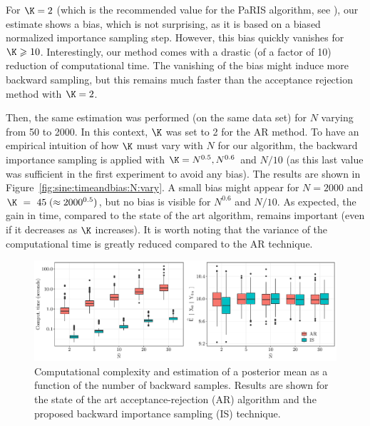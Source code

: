\documentclass[12pt]{article}
\newcommand{\N}{N}
\newcommand{\eqsp}{\;}
\begin{document}
For $\K = 2$ (which is the recommended value for the PaRIS algorithm, see \cite{olsson2017efficient}), our estimate shows a bias, which is not surprising, as it is based on a biased normalized importance sampling step. However, this bias quickly vanishes for $\K \geqslant 10$. 
Interestingly, our method comes with a drastic (of a factor of 10) reduction of computational time. 
The vanishing of the bias might induce more backward sampling, but this remains much faster than the acceptance rejection method with $\K = 2$.

Then, the same estimation was performed (on the same data set) for $\N$ varying from 50 to 2000.
In this context, $\K$ was set to 2 for the AR method. 
To have an empirical intuition of how $\K$ must vary with $\N$ for our algorithm, the backward importance sampling  is applied with $\K = \N^{0.5}, \N^{0.6}$ and $N / 10$ (as this last value was sufficient in the first experiment to avoid any bias). The results are shown in Figure~\ref{fig:sine:timeandbias:N:vary}. A  small bias might appear for $\N = 2000$ and $\K~=~45\eqsp(\approx 2000^{0.5})$, but no bias is visible for $\N^{0.6}$ and $\N /10$. 
As expected, the gain in time, compared to the state of the art algorithm, remains important (even if it decreases as $\K$ increases). 
It is worth noting that the variance of the computational time is greatly reduced compared to the AR technique.

\begin{figure}[h]
\begin{center}
\includegraphics[width = \textwidth]{Figure2.pdf}
\end{center}
\caption{Computational complexity and estimation of a posterior mean as a function of the number of backward samples. Results are shown for the state of the art acceptance-rejection (AR) algorithm and the proposed backward importance sampling (IS) technique.}
\label{fig:sine:timeandbias}
\end{figure}
\end{document}
